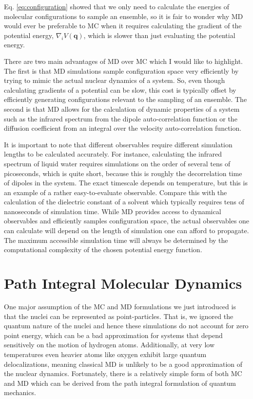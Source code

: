 \documentclass[11pt, proquest]{uwthesis}[2020/02/24]
\begin{document}
Eq. \ref{eq:configuration} showed that we only need to calculate the energies of molecular configurations to sample an ensemble, so it is fair to wonder why MD would ever be preferable to MC when it requires calculating the gradient of the potential energy, $\nabla_i V(\mathbf{q})$, which is slower than just evaluating the potential energy.

There are two main advantages of MD over MC which I would like to highlight. The first is that MD simulations sample configuration space very efficiently by trying to mimic the actual nuclear dynamics of a system. So, even though calculating gradients of a potential can be slow, this cost is typically offset by efficiently generating configurations relevant to the sampling of an ensemble. The second is that MD allows for the calculation of dynamic properties of a system such as the infrared spectrum from the dipole auto-correlation function or the diffusion coefficient from an integral over the velocity auto-correlation function.\autocite{green_markoff_1954}

It is important to note that different observables require different simulation lengths to be calculated accurately. For instance, calculating the infrared spectrum of liquid water requires simulations on the order of several tens of picoseconds, which is quite short, because this is roughly the decorrelation time of dipoles in the system. The exact timescale depends on temperature, but this is an example of a rather easy-to-evaluate observable. Compare this with the calculation of the dielectric constant of a solvent which typically requires tens of nanoseconds of simulation time.\autocite{gereben_accurate_2011} While MD provides access to dynamical observables and efficiently samples configuration space, the actual observables one can calculate will depend on the length of simulation one can afford to propagate. The maximum accessible simulation time will always be determined by the computational complexity of the chosen potential energy function.

\section{Path Integral Molecular Dynamics}
One major assumption of the MC and MD formulations we just introduced is that the nuclei can be represented as point-particles. That is, we ignored the quantum nature of the nuclei and hence these simulations do not account for zero point energy, which can be a bad approximation for systems that depend sensitively on the motion of hydrogen atoms.\autocite{markland_nuclear_2018} Additionally, at very low temperatures even heavier atoms like oxygen exhibit large quantum delocalizations, meaning classical MD is unlikely to be a good approximation of the nuclear dynamics.\autocite{schran_converged_2018,schran_quantum_2019} Fortunately, there is a relatively simple form of both MC and MD which can be derived from the path integral formulation of quantum mechanics.\autocite{feynman_quantum_2010}
\end{document}
